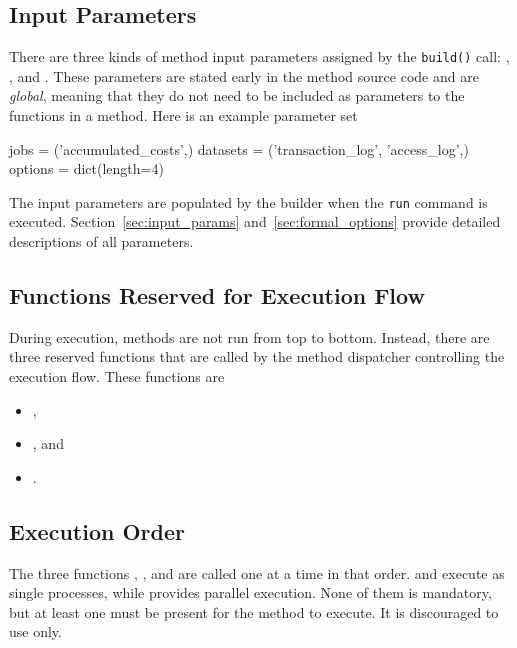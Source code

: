 \subsection{Input Parameters}
There are three kinds of method input parameters assigned by the
\texttt{build()} call: \jobs, \datasets, and \options.  These
parameters are stated early in the method source code and are
\textsl{global}, meaning that they do not need to be included as
parameters to the functions in a method.  Here is an example parameter
set
\begin{python}
jobs = ('accumulated_costs',)
datasets = ('transaction_log', 'access_log',)
options = dict(length=4)
\end{python}
The input parameters are populated by the builder when the
\texttt{run} command is executed.  Section~\ref{sec:input_params}
and~\ref{sec:formal_options} provide detailed descriptions of all
parameters.


\subsection{Functions Reserved for Execution Flow}
During execution, methods are not run from top to bottom.  Instead,
there are three reserved functions that are called by the method
dispatcher controlling the execution flow.  These functions are
\begin{itemize}
\item [] \prepare,
\item [] \analysis, and
\item [] \synthesis.
\end{itemize}


\subsection{Execution Order}
The three functions \prepare, \analysis, and \synthesis are called one
at a time in that order.  \prepare and \synthesis execute as single
processes, while \analysis provides parallel execution.  None of them
is mandatory, but at least one must be present for the method to
execute.  It is discouraged to use \prepare only.



